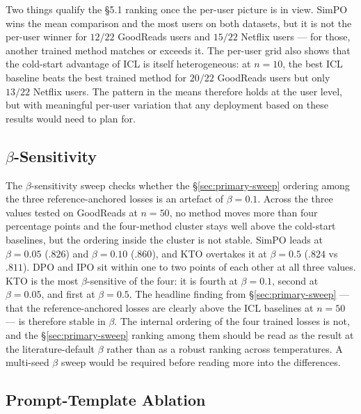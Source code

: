 Two things qualify the §5.1 ranking once the per-user picture is in view. SimPO wins the mean comparison and the most users on both datasets, but it is not the per-user winner for $12/22$ GoodReads users and $15/22$ Netflix users --- for those, another trained method matches or exceeds it. The per-user grid also shows that the cold-start advantage of ICL is itself heterogeneous: at $n = 10$, the best ICL baseline beats the best trained method for $20/22$ GoodReads users but only $13/22$ Netflix users. The pattern in the means therefore holds at the user level, but with meaningful per-user variation that any deployment based on these results would need to plan for.

\FloatBarrier

\subsection{\texorpdfstring{$\beta$-Sensitivity}{beta-Sensitivity}}
\label{sec:beta-sensitivity}

The $\beta$-sensitivity sweep checks whether the \S\ref{sec:primary-sweep}
ordering among the three reference-anchored losses is an artefact of
$\beta = 0.1$. Across the three values tested on GoodReads at $n = 50$,
no method moves more than four percentage points and the four-method
cluster stays well above the cold-start baselines, but the ordering
inside the cluster is not stable. SimPO leads at $\beta = 0.05$ ($.826$)
and $\beta = 0.10$ ($.860$), and KTO overtakes it at $\beta = 0.5$
($.824$ vs $.811$). DPO and IPO sit within one to two points of each
other at all three values. KTO is the most $\beta$-sensitive of the
four: it is fourth at $\beta = 0.1$, second at $\beta = 0.05$, and
first at $\beta = 0.5$. The headline finding from
\S\ref{sec:primary-sweep} --- that the reference-anchored losses are
clearly above the ICL baselines at $n = 50$ --- is therefore stable in
$\beta$. The internal ordering of the four trained losses is not, and
the \S\ref{sec:primary-sweep} ranking among them should be read as the
result at the literature-default $\beta$ rather than as a robust ranking
across temperatures. A multi-seed $\beta$ sweep would be required before
reading more into the differences.

\subsection{Prompt-Template Ablation}
\label{sec:prompt-ablation}

